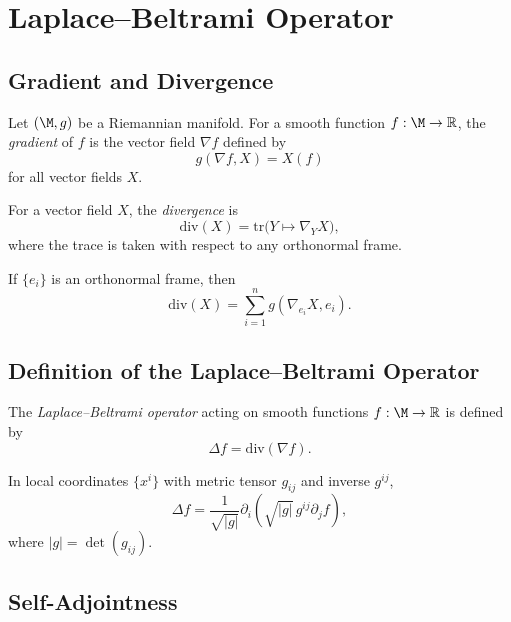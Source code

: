 
\section{Laplace--Beltrami Operator}

\subsection{Gradient and Divergence}

\begin{definition}
Let $(\M,g)$ be a Riemannian manifold.  
For a smooth function $f : \M \to \mathbb{R}$, the \emph{gradient} of $f$
is the vector field $\nabla f$ defined by
\[
g(\nabla f, X) = X(f)
\]
for all vector fields $X$.
\end{definition}

\begin{definition}
For a vector field $X$, the \emph{divergence} is
\[
\mathrm{div}(X)
= \mathrm{tr}\big(Y \mapsto \nabla_Y X\big),
\]
where the trace is taken with respect to any orthonormal frame.
\end{definition}

\begin{lemma}
If $\{e_i\}$ is an orthonormal frame, then
\[
\mathrm{div}(X) = \sum_{i=1}^n g(\nabla_{e_i} X, e_i).
\]
\end{lemma}

\subsection{Definition of the Laplace--Beltrami Operator}

\begin{definition}
The \emph{Laplace--Beltrami operator} acting on smooth functions
$f : \M \to \mathbb{R}$ is defined by
\[
\Delta f = \mathrm{div}(\nabla f).
\]
\end{definition}

\begin{lemma}
In local coordinates $\{x^i\}$ with metric tensor $g_{ij}$ and inverse
$g^{ij}$,
\[
\Delta f
= \frac{1}{\sqrt{|g|}}
\partial_i\!\left( \sqrt{|g|}\, g^{ij} \partial_j f \right),
\]
where $|g| = \det(g_{ij})$.
\end{lemma}

\subsection{Self-Adjointness}

